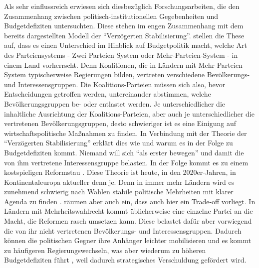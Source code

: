 Als sehr einflussreich erwiesen sich diesbezüglich Forschungsarbeiten, die den Zusammenhang zwischen politisch-institutionellen Gegebenheiten und Budgetdefiziten untersuchten. Diese stehen im engen Zusammenhang mit dem bereits dargestellten Modell der "`Verzögerten Stabilisierung"'. 
\textcite{Roubini1989} stellen die These auf, dass es einen Unterschied im Hinblick auf Budgetpolitik macht, welche Art des Parteiensystems - Zwei Parteien System oder Mehr-Parteien-System - in einem Land vorherrscht. Denn Koalitionen, die in Ländern mit Mehr-Parteien-System typischerweise Regierungen bilden, vertreten verschiedene Bevölkerungs- und Interessensgruppen. Die Koalitions-Parteien müssen sich also, bevor Entscheidungen getroffen werden, untereinander abstimmen, welche Bevölkerungsgruppen be- oder entlastet werden. Je unterschiedlicher die inhaltliche Ausrichtung der Koalitions-Parteien, aber auch je unterschiedlicher die vertretenen Bevölkerungsgruppen, desto schwieriger ist es eine Einigung auf wirtschaftspolitische Maßnahmen zu finden. In Verbindung mit der Theorie der "`Verzögerten Stabilisierung"' erklärt dies wie und warum es in der Folge zu Budgetdefiziten kommt. Niemand will sich "`als erster bewegen"' und damit die von ihm vertretene Interessensgruppe belasten. In der Folge kommt es zu einem kostspieligen Reformstau \parencite[S. 42]{Perotti1995b}. Diese Theorie ist heute, in den 2020er-Jahren, in Kontinentaleuropa aktueller denn je. Denn in immer mehr Ländern wird es zunehmend schwierig nach Wahlen stabile politische Mehrheiten mit klarer Agenda zu finden \parencite[S. 26]{Perotti1995b}. \textcite[S. 42]{Perotti1995b} räumen aber auch ein, dass auch hier ein Trade-off vorliegt. In Ländern mit Mehrheitswahlrecht kommt üblicherweise eine einzelne Partei an die Macht, die Reformen rasch umsetzen kann. Diese belastet dafür aber vorwiegend die von ihr nicht vertretenen Bevölkerungs- und Interessensgruppen. Dadurch können die politischen Gegner ihre Anhänger leichter mobilisieren und es kommt zu häufigeren Regierungswechseln, was aber wiederum zu höheren Budgetdefiziten führt \parencite[S. 6]{Roubini1989}, weil dadurch strategisches Verschuldung gefördert wird.

